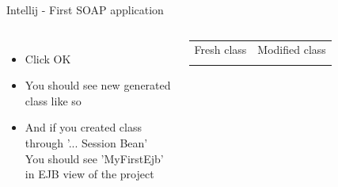 \documentclass[aspectratio=1610,english]{beamer} %
\begin{document}
\begin{frame}[fragile]{Intellij - First SOAP application}
\begin{columns}
				\begin{itemize}
					\tiny
					\color{black}
					\item Click OK
					\item You should see new generated class like so
					\item And if you created class through '... Session Bean' \\
						You should see 'MyFirstEjb' in EJB view of the project
				\end{itemize}
				
				\fontsize{3}{4} \selectfont				
				
				\begin{tabularx}{0.99\textwidth}{m{22.5em} m{20em}}
					Fresh class & Modified class \\
					\usebox\beforeBox 
						& \usebox\afterBox
				\end{tabularx} 
				
		\end{columns}
	\end{frame}	
\end{document}
